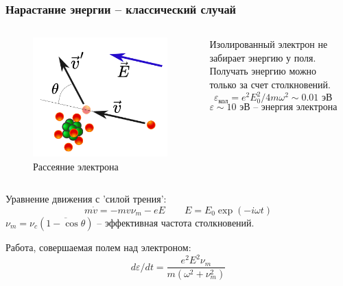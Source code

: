 \documentclass{beamer}
\begin{document}
	\begin{frame}
		\frametitle{Нарастание энергии -- классический случай}
		
		
		
		\begin{columns}
			\begin{figure}
				\centering
				\includegraphics[width=0.8\linewidth]{res/collision.png}
				\caption*{Рассеяние электрона}
			\end{figure}
			
			Изолированный электрон не забирает энергию у поля. Получать энергию можно только за счет столкновений.
			$$ \varepsilon_{\text{кол}} = e^2 E_0^2/4m\omega^2 \sim 0.01 \text{ эВ}$$
			$$ \varepsilon \sim 10 \text{ эВ} \text{ -- энергия электрона}$$
			\begin{center}
			\end{center}
		\end{columns}
		
		Уравнение движения с 'силой трения':
		$$ m \dot{v} = - m v \nu_m - e E \qquad E = E_0 \exp(-i \omega t)$$
		$\nu_m = \nu_c (\overline{1 - \cos \theta})$ -- эффективная частота столкновений.
		
		Работа, совершаемая полем над электроном:
		\begin{equation}
			\boxed{d\varepsilon/dt = \frac{e^2 E^2 \nu_m}{m (\omega^2 + \nu_m^2)}
			\label{eq:energy_growth}}
		\end{equation}


\end{frame}
\end{document}
